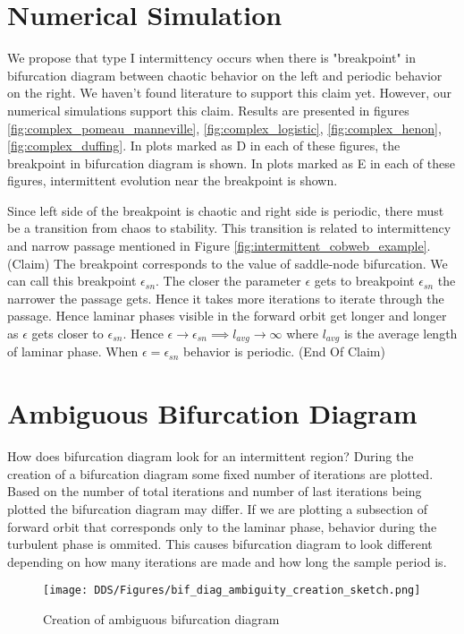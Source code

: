 \section{Numerical Simulation}
We propose that type I intermittency occurs when there is "breakpoint" in bifurcation diagram between chaotic behavior on the left and periodic behavior on the right.
We haven't found literature to support this claim yet.
However, our numerical simulations support this claim.
Results are presented in figures \ref{fig:complex_pomeau_manneville}, \ref{fig:complex_logistic}, \ref{fig:complex_henon}, \ref{fig:complex_duffing}.
In plots marked as D in each of these figures, the breakpoint in bifurcation diagram is shown.
In plots marked as E in each of these figures, intermittent evolution near the breakpoint is shown.
\par
Since left side of the breakpoint is chaotic and right side is periodic, there must be a transition from chaos to stability.
This transition is related to intermittency and narrow passage mentioned in Figure \ref{fig:intermittent_cobweb_example}.
(Claim) The breakpoint corresponds to the value of saddle-node bifurcation.
We can call this breakpoint $\epsilon_{sn}$.
The closer the parameter $\epsilon$ gets to breakpoint $\epsilon_{sn}$ the narrower the passage gets.
Hence it takes more iterations to iterate through the passage.
Hence laminar phases visible in the forward orbit get longer and longer as $\epsilon$ gets closer to $\epsilon_{sn}$.
Hence $\epsilon \rightarrow \epsilon_{sn} \implies l_{avg} \rightarrow \infty$ where $l_{avg}$ is the average length of laminar phase.
When $\epsilon = \epsilon_{sn}$ behavior is periodic.
(End Of Claim)

\section{Ambiguous Bifurcation Diagram}
How does bifurcation diagram look for an intermittent region?
During the creation of a bifurcation diagram some fixed number of iterations are plotted.
Based on the number of total iterations and number of last iterations being plotted the bifurcation diagram may differ.
If we are plotting a subsection of forward orbit that corresponds only to the laminar phase, behavior during the turbulent phase is ommited.
This causes bifurcation diagram to look different depending on how many iterations are made and how long the sample period is.
\par
\begin{figure}[!h]
    \centering
    \texttt{[image: DDS/Figures/bif\_diag\_ambiguity\_creation\_sketch.png]}
    \caption{Creation of ambiguous bifurcation diagram}
    \label{fig:ambiguous_bif_diag}
\end{figure}

